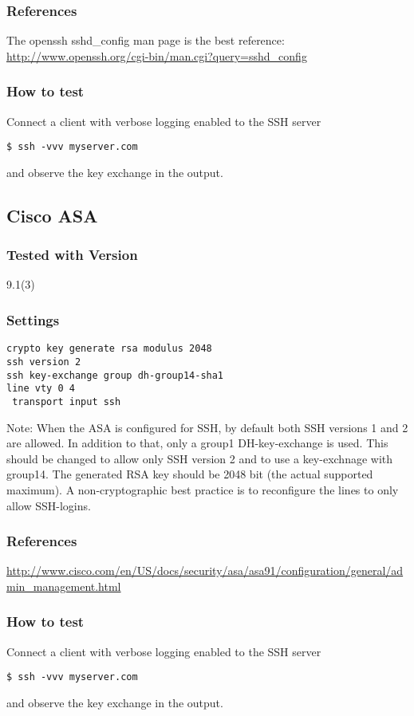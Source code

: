 \subsubsection{References}
The openssh sshd\_config  man page is the best reference: \url{http://www.openssh.org/cgi-bin/man.cgi?query=sshd_config}
\subsubsection{How to test}
Connect a client with verbose logging enabled to the SSH server \\
\begin{lstlisting}[breaklines]
$ ssh -vvv myserver.com
\end{lstlisting}and observe the key exchange in the output.


\subsection{Cisco ASA}
\subsubsection{Tested with Version} 9.1(3)
\subsubsection{Settings}
\begin{lstlisting}[breaklines]
crypto key generate rsa modulus 2048
ssh version 2
ssh key-exchange group dh-group14-sha1
line vty 0 4
 transport input ssh
\end{lstlisting}
Note: When the ASA is configured for SSH, by default both SSH versions 1 and 2 are allowed. In addition to that, only a group1 DH-key-exchange is used. This should be changed to allow only SSH version 2 and to use a key-exchnage with group14. The generated RSA key should be 2048 bit (the actual supported maximum). A non-cryptographic best practice is to reconfigure the lines to only allow SSH-logins.
\subsubsection{References}
\url{http://www.cisco.com/en/US/docs/security/asa/asa91/configuration/general/admin\_management.html }
\subsubsection{How to test}
Connect a client with verbose logging enabled to the SSH server \\
\begin{lstlisting}[breaklines]
$ ssh -vvv myserver.com
\end{lstlisting}and observe the key exchange in the output.



